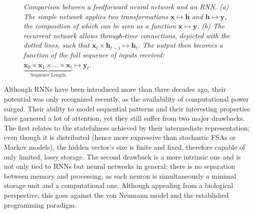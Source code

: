 \documentclass[]{article}
\begin{document}
\begin{figure}
\begin{minipage}{0.5\textwidth}
	\end{minipage}
	\caption[]
	{\small \textit{Comparison between a feedforward neural network and an RNN. (a) The simple network applies two transformations $\pmb{x} \mapsto \pmb{h}$ and $\pmb{h} \mapsto \pmb{y}$, the composition of which can be seen as a function $\pmb{x} \mapsto \pmb{y}$. (b) The recurrent network allows through-time connections, depicted with the dotted lines, such that $\pmb{x}_t \times \pmb{h}_{t-1} \mapsto \pmb{h}_t$. The output then becomes a function of the full sequence of inputs received: $\underbrace{\pmb{x}_0 \times \pmb{x}_1 \times \dots \times \pmb{x}_t}_{\text{Sequence Length}} \mapsto \pmb{y}_t$.}\label{fig:1}}
\end{figure}

Although RNNs have been introduced more than three decades ago, their potential was only recognized recently, as the availability of computational power surged. Their ability to model sequential patterns and their interesting properties have garnered a lot of attention, yet they still suffer from two major drawbacks. The first relates to the statefulness achieved by their intermediate representation; even though it is distributed (hence more expressive than stochastic FSAs or Markov models)\cite[Lecture~10]{Hinton13}, the hidden vector's size is finite and fixed, therefore capable of only limited, lossy storage. The second drawback is a more intrinsic one and is not only tied to RNNs but neural networks in general; there is no separation between memory and processing, as each neuron is simultaneously a minimal storage unit and a computational one. Although appealing from a biological perspective, this goes against the von Neumann model and the established programming paradigm. 
\end{document}
